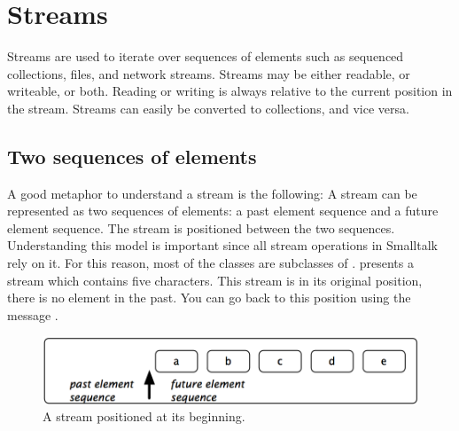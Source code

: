 \documentclass[a4paper,10pt,twoside]{book}
\begin{document}
	\renewcommand{\nnbb}[2]{} %
	\sloppy
\fi
\chapter{Streams}\label{cha:streams}

Streams are used to iterate over sequences of elements such as sequenced
collections, files, and network streams.
Streams may be either readable, or writeable, or both.
Reading or writing is always relative to the current position in the stream.
Streams can easily be converted to collections, and vice versa.

\section{Two sequences of elements}
A good metaphor to understand a stream is the following: A stream
can be represented as two sequences of elements: a past element sequence
and a future element sequence. The stream is positioned between the two
sequences. Understanding this model is important since all stream
operations in Smalltalk rely on it.
For this reason, most of the  classes are subclasses of .
 presents a stream which contains five characters. This stream is in its original position, \ie there is no element in the past. You can go back to this position using the message .

\begin{figure}[ht]
\centerline{\includegraphics[scale=0.5]{_abcdeStef}}
\caption{A stream positioned at its beginning.}
\label{fig:_abcde}
\vspace{.2in}
\end{figure}
\end{document}
